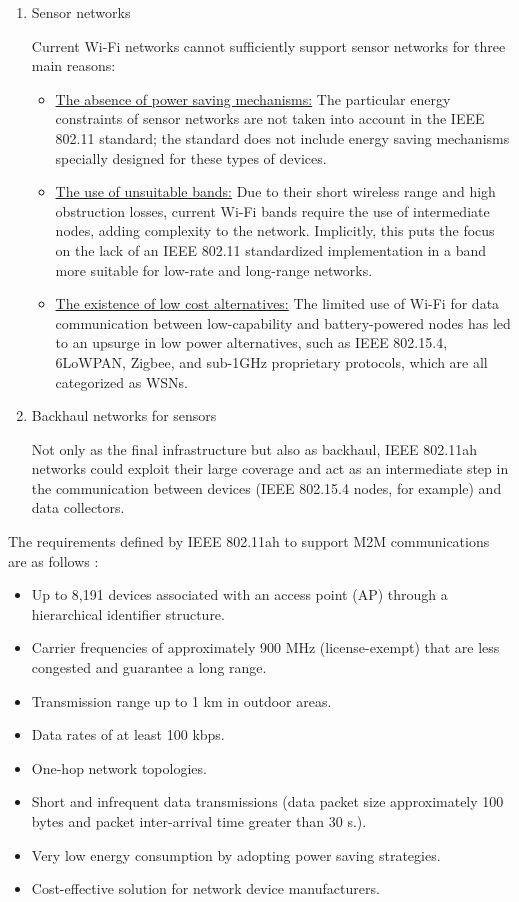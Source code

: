 \documentclass[]{article}
\begin{document}
\begin{enumerate}
\item Sensor networks
\par Current Wi-Fi networks cannot sufficiently support sensor networks for three main reasons:

\begin{itemize}
\item \underline{The absence of power saving mechanisms:} The particular energy constraints of sensor networks are not taken into account in the IEEE 802.11 standard; the standard does not include energy saving mechanisms specially designed for these types of devices.


\item \underline{The use of unsuitable bands:} Due to their short wireless range and high obstruction losses, current Wi-Fi bands require the use of intermediate nodes, adding complexity to the network. Implicitly, this puts the focus on the lack of an IEEE 802.11 standardized implementation in a band more suitable for low-rate and long-range networks.

\item \underline{The existence of low cost alternatives:} The limited use of Wi-Fi for data communication between low-capability and battery-powered nodes has led to an upsurge in low power alternatives, such as IEEE 802.15.4, 6LoWPAN, Zigbee, and sub-1GHz proprietary protocols, which are all categorized as WSNs.
\end{itemize}


\item Backhaul networks for sensors
\par Not only as the final infrastructure but also as backhaul, IEEE 802.11ah networks could exploit their large coverage and act as an intermediate step in the communication between devices (IEEE 802.15.4 nodes, for example) and data collectors.
\end{enumerate}

The requirements defined by IEEE 802.11ah to support M2M communications are as follows \cite{aust2012ieee,aust2012sub}:

\begin{itemize}
\item Up to 8,191 devices associated with an access point (AP) through a hierarchical identifier structure.
\item Carrier frequencies of approximately 900 MHz (license-exempt) that are less congested and guarantee a long range.
\item Transmission range up to 1 km in outdoor areas.
\item Data rates of at least 100 kbps.
\item One-hop network topologies.
\item Short and infrequent data transmissions (data packet size approximately 100 bytes and packet inter-arrival time greater than $30$ s.).
\item Very low energy consumption by adopting power saving strategies.
\item Cost-effective solution for network device manufacturers.
\end{itemize}
\end{document}
